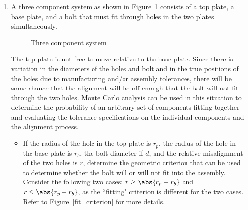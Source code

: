 \documentclass{article}
\begin{document}
	\begin{enumerate}
		\item
		A three component system as shown in Figure~\ref{three_component} consists of a top plate, a base plate, and a bolt that must fit through holes in the two plates simultaneously.
		\begin{figure}[!htbp]
			\begin{center}
			\caption{Three component system}
			\label{three_component}
			\end{center}
		\end{figure}
		The top plate is not free to move relative to the base plate. Since there is variation in the diameters of the holes and bolt and in the true positions of the holes due to manufacturing and/or assembly tolerances, there will be some chance that the alignment will be off enough that the bolt will not fit through the two holes. Monte Carlo analysis can be used in this situation to determine the probability of an arbitrary set of components fitting together and evaluating the tolerance specifications on the individual components and the alignment process.
		\begin{itemize}
			\item
			If the radius of the hole in the top plate is $r_p$, the radius of the hole in the base plate is $r_b$, the bolt diameter if $d$, and the relative misalignment of the two holes is $r$, determine the geometric criterion that can be used to determine whether the bolt will or will not fit into the assembly. Consider the following two cases: $r \geq \abs{r_p-r_b}$ and $r \leq \abs{r_p-r_b}$, as the ``fitting" criterion is different for the two cases. Refer to Figure~\ref{fit_criterion} for more details.
			\begin{figure}[!htbp]
				\begin{center}
\end{center}
\end{figure}
\end{itemize}
\end{enumerate}
\end{document}
